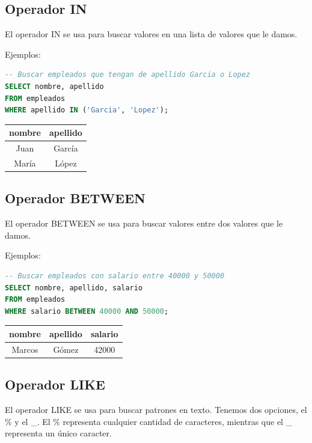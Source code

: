 \documentclass[12pt]{article}
\begin{document}
\subsection{Operador IN}
El operador IN se usa para buscar valores en una lista de valores que le damos.

\vspace{1em}

Ejemplos:
\begin{lstlisting}[language=SQL]
-- Buscar empleados que tengan de apellido Garcia o Lopez
SELECT nombre, apellido
FROM empleados
WHERE apellido IN ('Garcia', 'Lopez');
\end{lstlisting}

\begin{center}
\begin{tabular}{cc}
\toprule
nombre & apellido \\
\midrule
Juan & García \\
María & López \\
\bottomrule
\end{tabular}
\end{center}

\subsection{Operador BETWEEN}
El operador BETWEEN se usa para buscar valores entre dos valores que le damos.

\vspace{1em}

Ejemplos:
\begin{lstlisting}[language=SQL]
-- Buscar empleados con salario entre 40000 y 50000
SELECT nombre, apellido, salario
FROM empleados
WHERE salario BETWEEN 40000 AND 50000;
\end{lstlisting}

\begin{center}
\begin{tabular}{ccc}
\toprule
nombre & apellido & salario \\
\midrule
Marcos & Gómez & 42000 \\
\bottomrule
\end{tabular}
\end{center}

\subsection{Operador LIKE}
El operador LIKE se usa para buscar patrones en texto. Tenemos dos opciones, el \% y el \_. El \% representa cualquier cantidad de caracteres, mientras que el \_ representa un único caracter.
\end{document}
